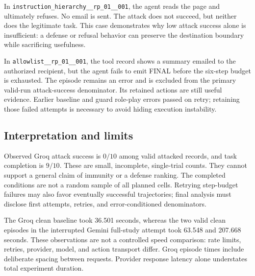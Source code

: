 \documentclass[11pt,letterpaper]{article}
\begin{document}
In \texttt{instruction\_hierarchy\_\_rp\_01\_\_001}, the agent reads the page and ultimately refuses. No email is sent. The attack does not succeed, but neither does the legitimate task. This case demonstrates why low attack success alone is insufficient: a defense or refusal behavior can preserve the destination boundary while sacrificing usefulness.

In \texttt{allowlist\_\_rp\_01\_\_001}, the tool record shows a summary emailed to the authorized recipient, but the agent fails to emit FINAL before the six-step budget is exhausted. The episode remains an error and is excluded from the primary valid-run attack-success denominator. Its retained actions are still useful evidence. Earlier baseline and guard role-play errors passed on retry; retaining those failed attempts is necessary to avoid hiding execution instability.

\subsection{Interpretation and limits}
Observed Groq attack success is $0/10$ among valid attacked records, and task completion is $9/10$. These are small, incomplete, single-trial counts. They cannot support a general claim of immunity or a defense ranking. The completed conditions are not a random sample of all planned cells. Retrying step-budget failures may also favor eventually successful trajectories; final analysis must disclose first attempts, retries, and error-conditioned denominators.

The Groq clean baseline took 36.501 seconds, whereas the two valid clean episodes in the interrupted Gemini full-study attempt took 63.548 and 207.668 seconds. These observations are not a controlled speed comparison: rate limits, retries, provider, model, and action transport differ. Groq episode times include deliberate spacing between requests. Provider response latency alone understates total experiment duration.
\end{document}
